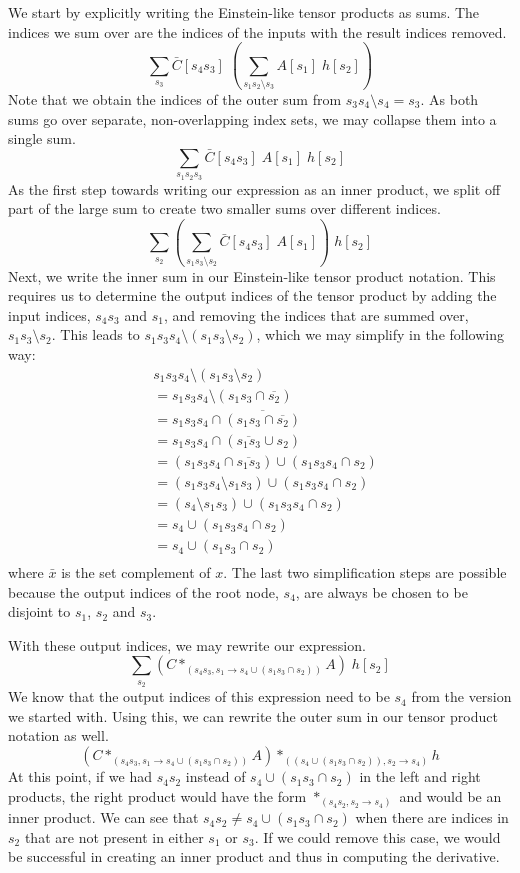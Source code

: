 \documentclass[12pt, a4paper]{report}
\begin{document}
We start by explicitly writing the Einstein-like tensor products as sums.
The indices we sum over are the indices of the inputs with the result indices removed.
$$
\sum_{s_3} \bar{C}[s_4 s_3] \; (\sum_{s_1 s_2 \setminus s_3} A[s_1] \; h[s_2]) 
$$
Note that we obtain the indices of the outer sum from $s_3 s_4 \setminus s_4 = s_3$.
As both sums go over separate, non-overlapping index sets, we may collapse them into a single sum.
$$
\sum_{s_1 s_2 s_3} \bar{C}[s_4 s_3] \; A[s_1] \; h[s_2]
$$
As the first step towards writing our expression as an inner product, we split off part of the large sum to create two smaller sums over different indices.
$$
\sum_{s_2} (\sum_{s_1 s_3 \setminus s_2} \bar{C}[s_4 s_3] \; A[s_1]) \; h[s_2]
$$
Next, we write the inner sum in our Einstein-like tensor product notation.
This requires us to determine the output indices of the tensor product by adding the input indices, $s_4 s_3$ and $s_1$, and removing the indices that are summed over, $s_1 s_3 \setminus s_2$.
This leads to $s_1 s_3 s_4 \setminus (s_1 s_3 \setminus s_2)$, which we may simplify in the following way:
\begin{align*}
&s_1 s_3 s_4 \setminus (s_1 s_3 \setminus s_2) \\
&= s_1 s_3 s_4 \setminus (s_1 s_3 \cap \overline{s_2}) \\
&= s_1 s_3 s_4 \cap \overline{(s_1 s_3 \cap \overline{s_2})} \\
&= s_1 s_3 s_4 \cap (\overline{s_1 s_3} \cup s_2) \\
&= (s_1 s_3 s_4 \cap \overline{s_1 s_3}) \cup (s_1 s_3 s_4 \cap s_2) \\
&= (s_1 s_3 s_4 \setminus s_1 s_3) \cup (s_1 s_3 s_4 \cap s_2) \\
&= (s_4 \setminus s_1 s_3) \cup (s_1 s_3 s_4 \cap s_2) \\
&= s_4 \cup (s_1 s_3 s_4 \cap s_2) \\
&= s_4 \cup (s_1 s_3 \cap s_2) \\
\end{align*}
where $\bar{x}$ is the set complement of $x$.
The last two simplification steps are possible because the output indices of the root node, $s_4$, are always be chosen to be disjoint to $s_1$, $s_2$ and $s_3$.

With these output indices, we may rewrite our expression.
$$
\sum_{s_2} (C *_{(s_4 s_3, s_1 \rightarrow s_4 \cup (s_1 s_3 \cap s_2))} A) \; h[s_2]
$$
We know that the output indices of this expression need to be $s_4$ from the version we started with.
Using this, we can rewrite the outer sum in our tensor product notation as well.
$$
(C *_{(s_4 s_3, s_1 \rightarrow s_4 \cup (s_1 s_3 \cap s_2))} A) *_{((s_4 \cup (s_1 s_3 \cap s_2)), s_2 \rightarrow s_4)} h
$$
At this point, if we had $s_4 s_2$ instead of $s_4 \cup (s_1 s_3 \cap s_2)$ in the left and right products, the right product would have the form $*_{(s_4 s_2, s_2 \rightarrow s_4)}$ and would be an inner product.
We can see that $s_4 s_2 \neq s_4 \cup (s_1 s_3 \cap s_2)$ when there are indices in $s_2$ that are not present in either $s_1$ or $s_3$.
If we could remove this case, we would be successful in creating an inner product and thus in computing the derivative.
\end{document}
